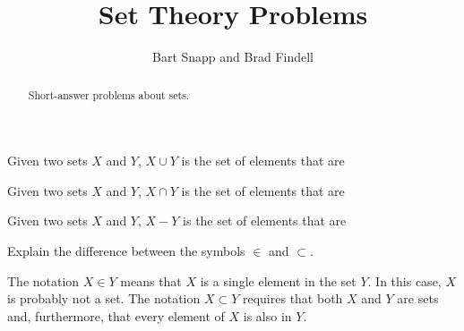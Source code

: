 \documentclass[nooutcomes]{ximera}
\title{Set Theory Problems}
\author{Bart Snapp and Brad Findell}
\begin{document}
\begin{abstract}
Short-answer problems about sets. 
\end{abstract}
\maketitle

\begin{problem}
Given two sets $X$ and $Y$, $X\cup Y$ is the set of elements that are
\begin{multipleChoice}
\end{multipleChoice}
\end{problem}

\begin{problem}
Given two sets $X$ and $Y$, $X\cap Y$ is the set of elements that are 
\begin{multipleChoice}
\end{multipleChoice}
\end{problem}

\begin{problem}
Given two sets $X$ and $Y$, $X - Y$ is the set of elements that are 
\begin{multipleChoice}
\end{multipleChoice}
\end{problem}

\begin{problem}
Explain the difference between the symbols $\in$ and $\subset$.
\begin{freeResponse}
\begin{hint}
The notation $X \in Y$ means that $X$ is a single element in the set $Y$.  In this case, $X$ is probably not a set.  The notation $X \subset Y$ requires that both $X$ and $Y$ are sets and, furthermore, that every element of $X$ is also in $Y$.
\end{hint}
\end{freeResponse}
\end{problem}
\end{document}
